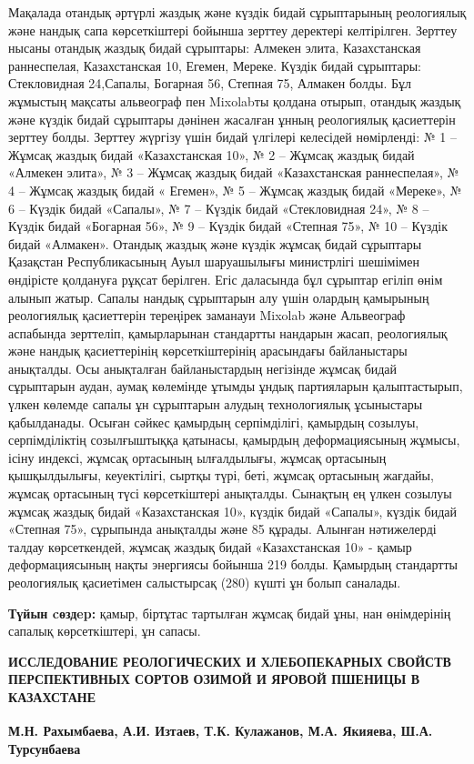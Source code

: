 Мақалада отандық әртүрлі жаздық және күздік бидай сұрыптарының
реологиялық және нандық сапа көрсеткіштері бойынша зерттеу деректері
келтірілген. Зерттеу нысаны отандық жаздық бидай сұрыптары: Алмекен
элита, Казахстанская раннеспелая, Казахстанская 10, Егемен, Мереке.
Күздік бидай сұрыптары: Стекловидная 24,Сапалы, Богарная 56, Степная 75,
Алмакен болды. Бұл жұмыстың мақсаты альвеограф пен Mixolabты қолдана
отырып, отандық жаздық және күздік бидай сұрыптары дәнінен жасалған
ұнның реологиялық қасиеттерін зерттеу болды. Зерттеу жүргізу үшін бидай
үлгілері келесідей нөмірленді: № 1 -- Жұмсақ жаздық бидай «Казахстанская
10», № 2 -- Жұмсақ жаздық бидай «Алмекен элита», № 3 -- Жұмсақ жаздық
бидай «Казахстанская раннеспелая», № 4 -- Жұмсақ жаздық бидай « Егемен»,
№ 5 -- Жұмсақ жаздық бидай «Мереке», № 6 -- Күздік бидай «Сапалы», № 7
-- Күздік бидай «Стекловидная 24», № 8 -- Күздік бидай «Богарная 56», №
9 -- Күздік бидай «Степная 75», № 10 -- Күздік бидай «Алмакен». Отандық
жаздық және күздік жұмсақ бидай сұрыптары Қазақстан Республикасының Ауыл
шаруашылығы министрлігі шешімімен өндірісте қолдануға рұқсат берілген.
Егіс даласында бұл сұрыптар егіліп өнім алынып жатыр. Сапалы нандық
сұрыптарын алу үшін олардың қамырының реологиялық қасиеттерін тереңірек
заманауи Mixolab және Альвеограф аспабында зерттеліп, қамырларынан
стандартты нандарын жасап, реологиялық және нандық қасиеттерінің
көрсеткіштерінің арасындағы байланыстары анықталды. Осы анықталған
байланыстардың негізінде жұмсақ бидай сұрыптарын аудан, аумақ көлемінде
ұтымды ұндық партияларын қалыптастырып, үлкен көлемде сапалы ұн
сұрыптарын алудың технологиялық ұсыныстары қабылданады. Осыған сәйкес
қамырдың серпімділігі, қамырдың созылуы, серпімділіктің созылғыштыққа
қатынасы, қамырдың деформациясының жұмысы, ісіну индексі, жұмсақ
ортасының ылғалдылығы, жұмсақ ортасының қышқылдылығы, кеуектілігі,
сыртқы түрі, беті, жұмсақ ортасының жағдайы, жұмсақ ортасының түсі
көрсеткіштері анықталды. Сынақтың ең үлкен созылуы жұмсақ жаздық бидай
«Казахстанская 10», күздік бидай «Сапалы», күздік бидай «Степная 75»,
сұрыпында анықталды және 85 құрады. Алынған нәтижелерді талдау
көрсеткендей, жұмсақ жаздық бидай «Казахстанская 10» - қамыр
деформациясының нақты энергиясы бойынша 219 болды. Қамырдың стандартты
реологиялық қасиетімен салыстырсақ (280) күшті ұн болып саналады.

{\bfseries Түйын cөздep:} қамыр, біртұтас тартылған жұмсақ бидай ұны, нан
өнімдерінің сапалық көрсеткіштері, ұн сапасы.

\begin{articleheader}
{\bfseries ИССЛЕДОВАНИЕ РЕОЛОГИЧЕСКИХ И ХЛЕБОПЕКАРНЫХ СВОЙСТВ ПЕРСПЕКТИВНЫХ СОРТОВ ОЗИМОЙ И ЯРОВОЙ ПШЕНИЦЫ В КАЗАХСТАНЕ}

{\bfseries
М.Н. Рахымбаева,
А.И. Изтаев,
Т.К. Кулажанов,
М.А. Якияева\textsuperscript{\envelope },
Ш.А. Турсунбаева}
\end{articleheader}


